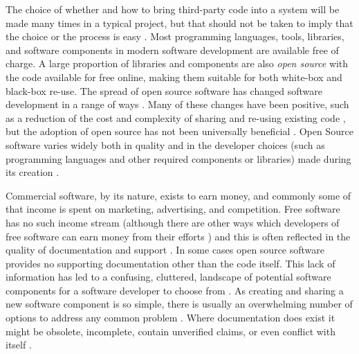 The choice of whether and how to bring third-party code into a system will be made many times in a typical project, but that should not be taken to imply that the choice or the process is easy \citep{Nazir2014} \citep{Badampudi2017} \citep{Paschali2017}. Most programming  languages, tools, libraries, and software components in modern software development are available free of charge. A large proportion of libraries and components are also \emph{open source} \citep{Androutsellis-Theotokis2011} with the code available for free online, making them suitable for both white-box and black-box re-use. The spread of open source software has changed software development in a range of ways \citep{OReilly1999}. Many of these changes have been positive, such as a reduction of the cost and complexity of sharing and re-using existing code \citep{OReilly1999}, but the adoption of open source has not been universally beneficial \citep{Vasilescu2013}. Open Source software varies widely both in quality and in the developer choices (such as programming languages and other required components or libraries) made during its creation \citep{Bissyande2013}.

Commercial software, by its nature, exists to earn money, and commonly some of that income is spent on marketing, advertising, and competition. Free software has no such income stream (although there are other ways which developers of free software can earn money from their efforts \citep{Hall2016} \citep{Lowry2008}) and this is often reflected in the quality of documentation and support \citep{Sowe2008}. In some cases open source software provides no supporting documentation other than the code itself. This lack of information has led to a confusing, cluttered, landscape of potential software components for a software developer to choose from \citep{Teixeira2015}. As creating and sharing a new software component is so simple, there is usually an overwhelming number of options to address any common problem \citep{Spinellis2019}. Where documentation does exist it might be obsolete, incomplete, contain unverified claims, or even conflict with itself \citep{Midha2011} \citep{Raja2012}.

